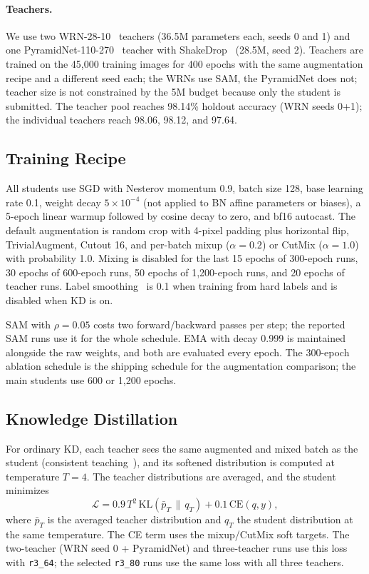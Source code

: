 \paragraph{Teachers.}
We use two WRN-28-10~\citep{zagoruyko2016wide} teachers (36.5M parameters each, seeds 0 and 1) and one
PyramidNet-110-270~\citep{han2017pyramidal} teacher with ShakeDrop~\citep{yamada2019shakedrop} (28.5M, seed 2). Teachers are trained
on the 45,000 training images for 400 epochs with the same augmentation recipe and a different seed each; the WRNs use SAM, the PyramidNet does not;
teacher size is not constrained by the 5M budget because only the student is
submitted. The teacher pool reaches 98.14\% holdout accuracy (WRN seeds 0+1); the
individual teachers reach 98.06, 98.12, and 97.64.

\subsection{Training Recipe}

All students use SGD with Nesterov momentum 0.9, batch size 128, base learning
rate 0.1, weight decay $5\times10^{-4}$ (not applied to BN affine parameters or
biases), a 5-epoch linear warmup followed by cosine decay to zero, and bf16
autocast. The default augmentation is random crop with 4-pixel padding plus
horizontal flip, TrivialAugment, Cutout 16, and per-batch mixup ($\alpha=0.2$) or
CutMix ($\alpha=1.0$) with probability 1.0. Mixing is disabled for the last 15
epochs of 300-epoch runs, 30 epochs of 600-epoch runs, 50 epochs of 1,200-epoch
runs, and 20 epochs of teacher runs. Label smoothing~\citep{szegedy2016rethinking} is 0.1 when training from hard labels and is disabled when
KD is on.

SAM with $\rho=0.05$ costs two forward/backward passes per step; the reported SAM
runs use it for the whole schedule. EMA with decay 0.999 is maintained alongside
the raw weights, and both are evaluated every epoch. The 300-epoch ablation
schedule is the shipping schedule for the augmentation comparison; the main
students use 600 or 1,200 epochs.

\subsection{Knowledge Distillation}

For ordinary KD, each teacher sees the same augmented and mixed batch as the
student (consistent teaching~\citep{beyer2022patient}), and its softened distribution is computed at temperature $T=4$. The
teacher distributions are averaged, and the student minimizes
\begin{equation}
\mathcal{L} = 0.9\,T^2\,\mathrm{KL}\!\left(\bar{p}_T \,\|\, q_T\right)
+ 0.1\,\mathrm{CE}(q, y),
\end{equation}
where $\bar{p}_T$ is the averaged teacher distribution and $q_T$ the student
distribution at the same temperature. The CE term uses the mixup/CutMix soft
targets. The two-teacher (WRN seed 0 + PyramidNet) and three-teacher runs use this loss with
\texttt{r3\_64}; the selected \texttt{r3\_80} runs use the same loss with all
three teachers.

